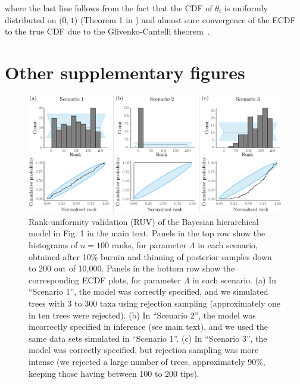 \documentclass[oneside]{article}
\begin{document}
\noindent where the last line follows from the fact that the CDF of $\theta_i$ is uniformly distributed on $(0, 1$) (Theorem 1 in \citealp{Cook06}) and almost sure convergence of the ECDF to the true CDF due to the  Glivenko-Cantelli theorem~\cite[page 275]{Billingsley1986}.

\newpage
\section{Other supplementary figures}
\label{appendix::sec:supp_figures}

\begin{figure}[!ht]
   \includegraphics[width=\linewidth]{../figures/sbc_Yule_lambda_manual.pdf}
  \caption{Rank-uniformity validation (RUV) of the Bayesian hierarchical model in Fig. 1 in the main text.
    Panels in the top row show the histograms of $n=100$ ranks, for parameter $\Lambda$ in each scenario, obtained after 10\% burnin and thinning of posterior samples down to 200 out of 10,000.
    Panels in the bottom row show the corresponding ECDF plots, for parameter $\Lambda$ in each scenario.
    (a) In ``Scenario 1'', the model was correctly specified, and we simulated trees with 3 to 300 taxa using rejection sampling (approximately one in ten trees were rejected).
    (b) In ``Scenario 2'', the model was incorrectly specified in inference (see main text), and we used the same data sets simulated in ``Scenario 1''.
    (c) In ``Scenario 3'', the model was correctly specified, but rejection sampling was more intense (we rejected a large number of trees, approximately 90\%, keeping those having between 100 to 200 tips).
   }
  \label{supfig:ruv_yule_lambda}
\end{figure}
\end{document}
